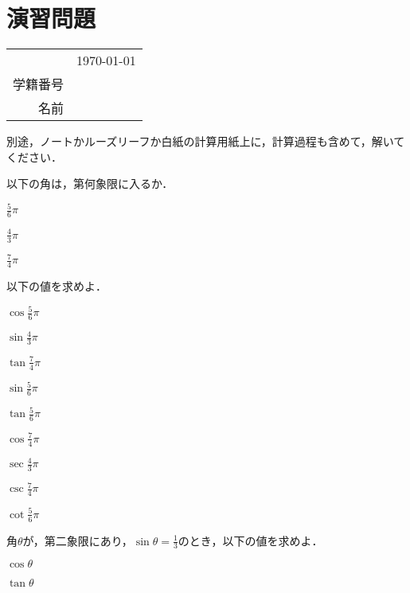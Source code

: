\section*{演習問題}
\begin{table}[!t]
	\begin{flushright}
		\begin{tabular}{rc}
			& \usdate\today \\
			学籍番号 & \\
			名前 & \\
		\end{tabular}
	\end{flushright}
\end{table}
別途，ノートかルーズリーフか白紙の計算用紙上に，計算過程も含めて，解いてください．

\begin{question}
	以下の角は，第何象限に入るか．
	\begin{tabenum}[(1)]
		\item $\displaystyle \frac{5}{6}\pi$
		\item $\displaystyle \frac{4}{3}\pi$
		\item $\displaystyle \frac{7}{4}\pi$
	\end{tabenum}
\end{question}

\begin{question}
	以下の値を求めよ．
	\begin{tabenum}[(1)]
		\item $\displaystyle \cos\frac{5}{6}\pi$
		\item $\displaystyle \sin\frac{4}{3}\pi$
		\item $\displaystyle \tan\frac{7}{4}\pi$ \\[2ex]
		\item $\displaystyle \sin\frac{5}{6}\pi$
		\item $\displaystyle \tan\frac{5}{6}\pi$
		\item $\displaystyle \cos\frac{7}{4}\pi$ \\[2ex]
		\item $\displaystyle \sec\frac{4}{3}\pi$
		\item $\displaystyle \csc\frac{7}{4}\pi$
		\item $\displaystyle \cot\frac{5}{6}\pi$
	\end{tabenum}
\end{question}

\begin{question}
	角$\theta$が，第二象限にあり，$\displaystyle \sin\theta = \frac{1}{3}$のとき，以下の値を求めよ．
	\begin{tabenum}[(1)]
		\item $\displaystyle \cos\theta$
		\item $\displaystyle \tan\theta$
	\end{tabenum}
\end{question}

